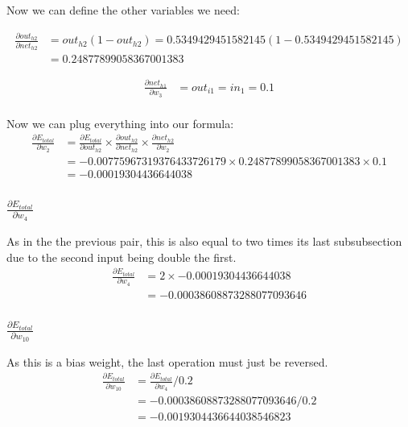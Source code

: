 \documentclass{article}
\begin{document}
Now we can define the other variables we need:

\begin{align*}
    \frac{\partial out_{h2}}{\partial net_{h2}} & =
    out_{h2}(1 - out_{h2}) = 0.5349429451582145(1 - 0.5349429451582145) \\
    & = 0.24877899058367001383
\end{align*}

\begin{align*}
    \frac{\partial net_{h1}}{\partial w_3} & = 
    out_{i1} = in_{1} = 0.1 \\
\end{align*}

Now we can plug everything into our formula:
\begin{align*} \frac{\partial E_{total}}{\partial w_2} & =
    \frac{\partial E_{total}}{\partial out_{h2}} \times
    \frac{\partial out_{h2}}{\partial net_{h2}} \times
    \frac{\partial net_{h2}}{\partial w_2} \\
    &= -0.00775967319376433726179 \times 0.24877899058367001383 \times 0.1 \\
    &= -0.00019304436644038
\end{align*}
\subsubsection{$\frac{\partial E_{total}}{\partial w_4}$}
As in the the previous pair, this is also equal to two times its last 
subsubsection due to the second input being double the first.
\begin{align*}
\frac{\partial E_{total}}{\partial w_4} & = 2 \times -0.00019304436644038 \\
& = -0.00038608873288077093646
\end{align*}
\subsubsection{$\frac{\partial E_{total}}{\partial w_{10}}$}
As this is a bias weight, the last operation must just be reversed.
\begin{align*}
\frac{\partial E_{total}}{\partial w_{10}} & =
\frac{\partial E_{total}}{\partial w_4} / 0.2 \\
& = -0.00038608873288077093646 / 0.2 \\
& = -0.0019304436644038546823
\end{align*}
\end{document}

